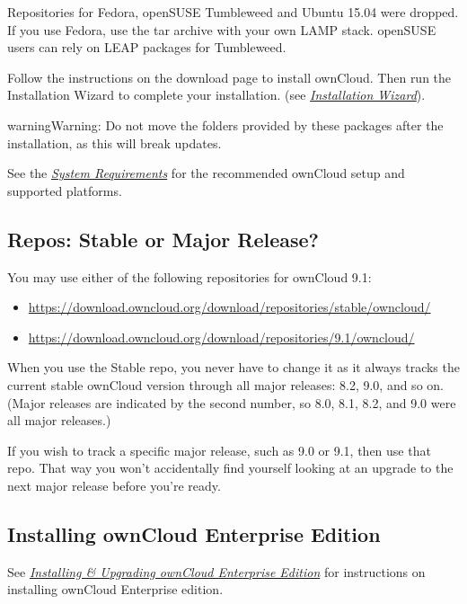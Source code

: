\documentclass[letterpaper,10pt,english]{sphinxmanual}
\begin{document}
Repositories for Fedora, openSUSE Tumbleweed and Ubuntu 15.04 were dropped. If
you use Fedora, use the tar archive with your own LAMP stack. openSUSE
users can rely on LEAP packages for Tumbleweed.

Follow the instructions on the download page to install ownCloud. Then run the
Installation Wizard to complete your installation. (see
{\hyperref[installation/installation_wizard::doc]{\emph{\emph{Installation Wizard}}}}).

\begin{notice}{warning}{Warning:}
Do not move the folders provided by these packages after the
installation, as this will break updates.
\end{notice}

See the {\hyperref[installation/system_requirements::doc]{\emph{\emph{System Requirements}}}} for the recommended ownCloud setup and
supported platforms.


\subsection{Repos: Stable or Major Release?}
\label{installation/linux_installation:repos-stable-or-major-release}
You may use either of the following repositories for ownCloud 9.1:
\begin{itemize}
\item {} 
\href{https://download.owncloud.org/download/repositories/stable/owncloud/}{https://download.owncloud.org/download/repositories/stable/owncloud/}

\item {} 
\href{https://download.owncloud.org/download/repositories/9.1/owncloud/}{https://download.owncloud.org/download/repositories/9.1/owncloud/}

\end{itemize}

When you use the Stable repo, you never have to change it as it always tracks
the current stable ownCloud version through all major releases: 8.2, 9.0,
and so on. (Major releases are indicated by the second number, so 8.0, 8.1,
8.2, and 9.0 were all major releases.)

If you wish to track a specific major release, such as 9.0 or 9.1, then use
that repo. That way you won't accidentally find yourself looking at an upgrade
to the next major release before you're ready.


\subsection{Installing ownCloud Enterprise Edition}
\label{installation/linux_installation:installing-owncloud-enterprise-edition}
See {\hyperref[enterprise_installation/linux_installation::doc]{\emph{\emph{Installing \& Upgrading ownCloud Enterprise Edition}}}} for instructions on
installing ownCloud Enterprise edition.
\end{document}

